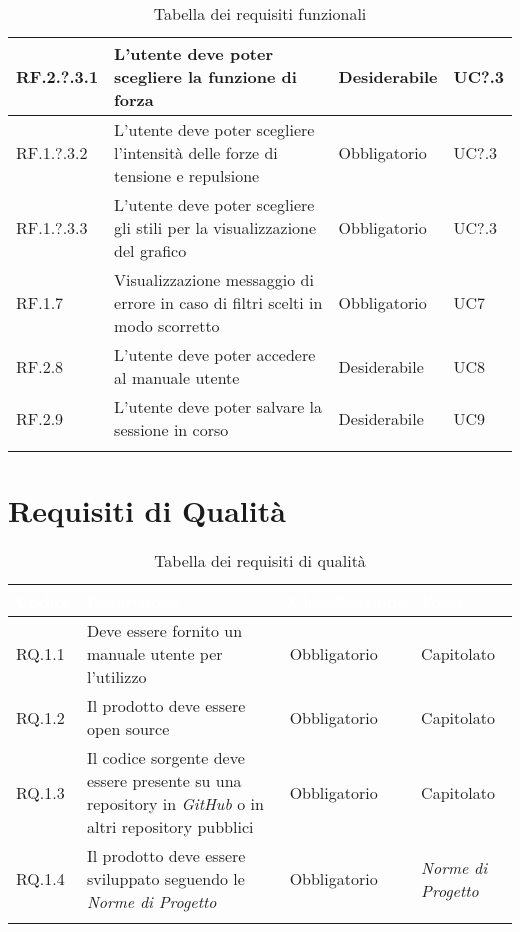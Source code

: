 \begin{center}
\begin{longtable}{|L{2cm}|C{5,5cm}|C{3cm}|C{2cm}|}
    RF.2.?.3.1 & L'utente deve poter scegliere la funzione di forza & Desiderabile & UC?.3 \\ \hline
    RF.1.?.3.2 & L'utente deve poter scegliere l'intensità delle forze di tensione e repulsione & Obbligatorio & UC?.3 \\ \hline
    RF.1.?.3.3 & L'utente deve poter scegliere gli stili per la visualizzazione del grafico & Obbligatorio & UC?.3 \\ \hline
    RF.1.7 & Visualizzazione messaggio di errore in caso di filtri scelti in modo scorretto & Obbligatorio & UC7 \\ \hline
    RF.2.8 & L'utente deve poter accedere al manuale utente & Desiderabile & UC8 \\ \hline
    RF.2.9 & L'utente deve poter salvare la sessione in corso & Desiderabile & UC9 \\ \hline

    \caption{Tabella dei requisiti funzionali}
  \end{longtable}
\end{center}

\section{Requisiti di Qualità}
\begin{center}
  \centering
  \begin{longtable}{|L{1,5cm}|C{5,5cm}|C{3cm}|C{2cm}|}
    \hline
    \textcolor[HTML]{FFFFFF}{\textbf{Codice}} & \textcolor[HTML]{FFFFFF}{\textbf{Descrizione}} & \textcolor[HTML]{FFFFFF}{\textbf{Classificazione}} & \textcolor[HTML]{FFFFFF}{\textbf{Fonti}}
    \\ \hline
    RQ.1.1 & Deve essere fornito un manuale utente per l'utilizzo & Obbligatorio & Capitolato \\ \hline
    RQ.1.2 & Il prodotto deve essere open source & Obbligatorio & Capitolato \\ \hline
    RQ.1.3 & Il codice sorgente deve essere presente su una repository in \textit{GitHub} o in altri repository pubblici & Obbligatorio & Capitolato \\ \hline
    RQ.1.4 & Il prodotto deve essere sviluppato seguendo le \textit{Norme di Progetto} & Obbligatorio & \textit{Norme di Progetto} \\ \hline

    \caption{Tabella dei requisiti di qualità}
  \end{longtable}
\end{center}


